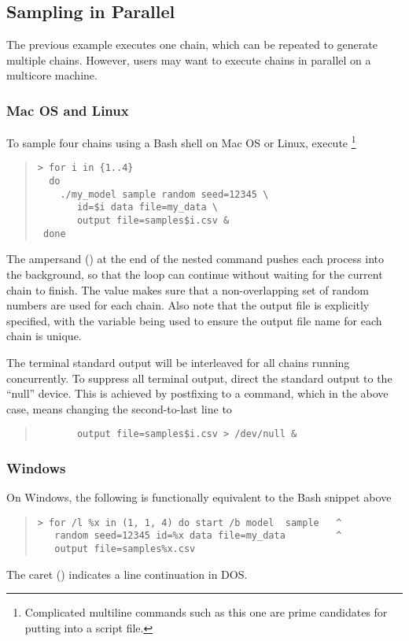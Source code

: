 \subsection{Sampling in Parallel}

The previous example executes one chain, which can be repeated to
generate multiple chains. However, users may want to execute chains
in parallel on a multicore machine.

\subsubsection{Mac OS and Linux}

To sample four chains using a Bash shell on Mac OS or Linux, execute%
%
\footnote{Complicated multiline commands such as this one are prime candidates for putting into a script file.}
%
\begin{quote}
\begin{Verbatim}[fontshape=sl]
> for i in {1..4}
  do
    ./my_model sample random seed=12345 \
       id=$i data file=my_data \
       output file=samples$i.csv &
 done
\end{Verbatim}
\end{quote}
%
The ampersand (\code{\&}) at the end of the nested command pushes each process into the background, so that the loop can continue without waiting for the current chain to finish.  The  value makes sure that a non-overlapping set of random numbers are used for each chain.  Also note that the output file is explicitly specified, with the variable  being used to ensure the output file name for each chain is unique.

The terminal standard output will be interleaved for all chains
running concurrently.  To suppress all terminal output, direct the
standard output to the ``null'' device.  This is achieved by
postfixing \code{> /dev/null} to a command, which in the above case,
means changing the second-to-last line to
\begin{quote}
\begin{Verbatim}
       output file=samples$i.csv > /dev/null &
\end{Verbatim}
\end{quote}



\subsubsection{Windows}

On Windows, the following is functionally equivalent to the Bash
snippet above
%
\begin{quote}
\begin{Verbatim}[fontshape=sl]
> for /l %x in (1, 1, 4) do start /b model  sample   ^
   random seed=12345 id=%x data file=my_data         ^
   output file=samples%x.csv
\end{Verbatim}
\end{quote}
%
The caret (\code{\textasciicircum}) indicates a line continuation in
DOS.

